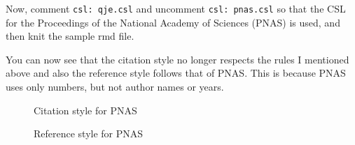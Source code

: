 \documentclass[
  letterpaper,
  DIV=11,
  numbers=noendperiod]{scrreprt}
\begin{document}
Now, comment \texttt{csl:\ qje.csl} and uncomment
\texttt{csl:\ pnas.csl} so that the CSL for the Proceedings of the
National Academy of Sciences (PNAS) is used, and then knit the sample
rmd file.

You can now see that the citation style no longer respects the rules I
mentioned above and also the reference style follows that of PNAS. This
is because PNAS uses only numbers, but not author names or years.

\begin{tcolorbox}[enhanced jigsaw, colframe=quarto-callout-note-color-frame, breakable, left=2mm, toprule=.15mm, colback=white, arc=.35mm, rightrule=.15mm, bottomrule=.15mm, opacityback=0, leftrule=.75mm]

\begin{figure}[H]

\begin{minipage}[t]{\linewidth}

{\centering 


\caption{Citation style for PNAS}

}

\end{minipage}%
\newline
\begin{minipage}[t]{\linewidth}

{\centering 


\caption{Reference style for PNAS}

}

\end{minipage}%

\end{figure}

\end{tcolorbox}
\end{document}
